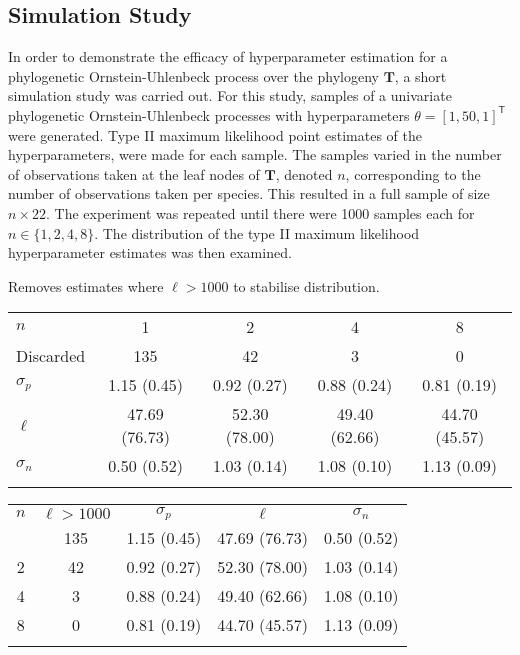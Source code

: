 \documentclass[wsdraft]{ws-rv9x6} %
\begin{document}
\subsection{Simulation Study}

In order to demonstrate the efficacy of hyperparameter estimation for a phylogenetic Ornstein-Uhlenbeck process over the phylogeny \(\mathbf{T}\), a short simulation study was carried out. For this study, samples of a univariate phylogenetic Ornstein-Uhlenbeck processes with hyperparameters \(\theta= [1,50,1]^{\mathsf{T}}\) were generated. Type II maximum likelihood point estimates of the hyperparameters, were made for each sample. The samples varied in the number of observations taken at the leaf nodes of \(\mathbf{T}\), denoted \(n\), corresponding to the number of observations taken per species. This resulted in a full sample of size \(n \times 22\). The experiment was repeated until there were 1000 samples each for \(n \in \{1,2,4,8\}\). The distribution of the type II maximum likelihood hyperparameter estimates was then examined.

Removes estimates where \(\ell > 1000\) to stabilise distribution.

\begin{table}[ht]
	{
		\begin{tabular}{@{}lcccc@{}} \toprule
			\(n\) & 1 & 2 & 4 & 8  \\ 
			\colrule
			Discarded & 135 & 42 & 3 & 0 \\
			\colrule
			\(\sigma_p \)  & 1.15 (0.45) & 0.92 (0.27) & 0.88 (0.24) & 0.81 (0.19)  \\
			\(\ell\)  & 47.69 (76.73) & 52.30 (78.00) & 49.40 (62.66) & 44.70 (45.57)  \\
			\(\sigma_n\)  & 0.50 (0.52) & 1.03 (0.14) & 1.08 (0.10) & 1.13 (0.09) \\

			\botrule
		\end{tabular}
	}
	\label{tab::simulation}
\end{table}

\begin{table}[ht]
	{
		\begin{tabular}{@{}ccccc@{}} \toprule
			\(n\) & \(\ell > 1000\) & \(\sigma_p \) & \(\ell\) & \(\sigma_n\) \\
			\colrule
			1 & 135 & 1.15 (0.45) & 47.69 (76.73) & 0.50 (0.52) \\
			2 & 42 & 0.92 (0.27) & 52.30 (78.00) & 1.03 (0.14) \\
			4 & 3 & 0.88 (0.24) & 49.40 (62.66) & 1.08 (0.10) \\
			8 & 0 & 0.81 (0.19) & 44.70 (45.57) & 1.13 (0.09) \\			
			\botrule
		\end{tabular}
	}
	\label{tab::simulation_option2}
\end{table}
\end{document}
